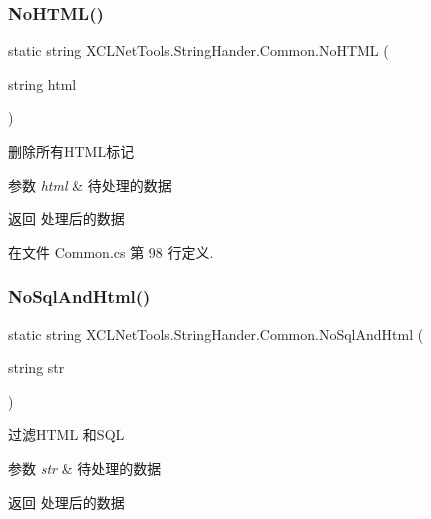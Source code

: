 \subsubsection{\texorpdfstring{No\+H\+T\+M\+L()}{NoHTML()}}
{\footnotesize\ttfamily static string X\+C\+L\+Net\+Tools.\+String\+Hander.\+Common.\+No\+H\+T\+ML (\begin{DoxyParamCaption}\item[{string}]{html }\end{DoxyParamCaption})\hspace{0.3cm}{\ttfamily [static]}}



删除所有\+H\+T\+M\+L标记 


\begin{DoxyParams}{参数}
{\em html} & 待处理的数据\\
\hline
\end{DoxyParams}
\begin{DoxyReturn}{返回}
处理后的数据
\end{DoxyReturn}


在文件 Common.\+cs 第 98 行定义.

\mbox{\label{class_x_c_l_net_tools_1_1_string_hander_1_1_common_a67d87071f6b40c184fd81a6f2e5e923e}} 
\subsubsection{\texorpdfstring{No\+Sql\+And\+Html()}{NoSqlAndHtml()}}
{\footnotesize\ttfamily static string X\+C\+L\+Net\+Tools.\+String\+Hander.\+Common.\+No\+Sql\+And\+Html (\begin{DoxyParamCaption}\item[{string}]{str }\end{DoxyParamCaption})\hspace{0.3cm}{\ttfamily [static]}}



过滤\+H\+T\+ML 和\+S\+QL 


\begin{DoxyParams}{参数}
{\em str} & 待处理的数据\\
\hline
\end{DoxyParams}
\begin{DoxyReturn}{返回}
处理后的数据
\end{DoxyReturn}


